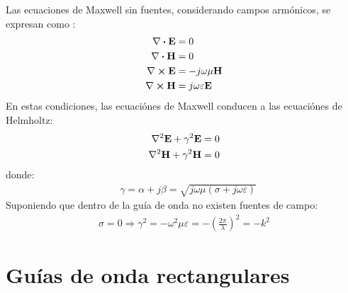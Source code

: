 Las ecuaciones de Maxwell sin fuentes, considerando campos armónicos, se expresan como \cite{Balaniselectro} \cite{Fernandez}:
\begin{align}
\nabla\boldsymbol{\cdot}\mathbf{E} &= 0
\label{ec_apA:1}\\
\nabla\boldsymbol{\cdot}\mathbf{H} &= 0
\label{ec_apA:2}\\
\nabla\boldsymbol{\times}\mathbf{E} &= -j\omega{\mu}\mathbf{H}
\label{ec_apA:3}\\
\nabla\boldsymbol{\times}\mathbf{H} &= j\omega{\varepsilon}\mathbf{E}
\label{ec_apA:4}
\end{align}
En estas condiciones, las ecuaciónes de Maxwell conducen a las ecuaciónes de Helmholtz:
\begin{subequations}
\label{grup_ec_apA:1}
\begin{align}
\nabla^2\mathbf{E} + \gamma ^2\mathbf{E} &= 0
\label{ec_apA:5}\\
\nabla^2\mathbf{H} + \gamma ^2\mathbf{H} &= 0
\label{ec_apA:6}
\end{align}
\end{subequations}
donde:
\begin{align}
&\gamma = \alpha + j\beta = \sqrt{j\omega\mu \left(\sigma + j\omega\varepsilon\right)}
\label{ec_apA:7}
\end{align}
Suponiendo que dentro de la guía de onda no existen fuentes de campo:
\begin{align}
\sigma = 0 \Longrightarrow\gamma^2 = -\omega^2\mu\varepsilon = -\left(\frac{2\pi}{\lambda}\right)^2 = - k^2
\label{ec_apA:8}
\end{align}

\section{Guías de onda rectangulares}
\label{sec_apendice_a_guia_rect}

